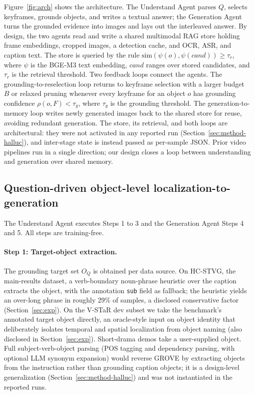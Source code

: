 Figure~\ref{fig:arch} shows the architecture. The Understand Agent parses $Q$, selects keyframes, grounds objects, and writes a textual answer; the Generation Agent turns the grounded evidence into images and lays out the interleaved answer. By design, the two agents read and write a shared multimodal RAG store holding frame embeddings, cropped images, a detection cache, and OCR, ASR, and caption text. The store is queried by the rule $\mathrm{sim}(\psi(o), \psi(cand)) \ge \tau_r$, where $\psi$ is the BGE-M3 text embedding, $cand$ ranges over stored candidates, and $\tau_r$ is the retrieval threshold. Two feedback loops connect the agents. The grounding-to-reselection loop returns to keyframe selection with a larger budget $B$ or relaxed pruning whenever every keyframe for an object $o$ has grounding confidence $\rho(o,F) < \tau_g$, where $\tau_g$ is the grounding threshold. The generation-to-memory loop writes newly generated images back to the shared store for reuse, avoiding redundant generation. The store, its retrieval, and both loops are architectural: they were not activated in any reported run (Section~\ref{sec:method-halluc}), and inter-stage state is instead passed as per-sample JSON. Prior video pipelines \citep{magnet2506,lvasagent2503} run in a single direction; our design closes a loop between understanding and generation over shared memory.

\subsection{Question-driven object-level localization-to-generation}\label{sec:method-pipeline}

The Understand Agent executes Steps 1 to 3 and the Generation Agent Steps 4 and 5. All steps are training-free.

\paragraph{Step 1: Target-object extraction.} The grounding target set $O_Q$ is obtained per data source. On HC-STVG, the main-results dataset, a verb-boundary noun-phrase heuristic over the caption extracts the object, with the annotation \texttt{sub} field as fallback; the heuristic yields an over-long phrase in roughly 29\% of samples, a disclosed conservative factor (Section~\ref{sec:exp}). On the V-STaR dev subset we take the benchmark's annotated target object directly, an oracle-style input on object identity that deliberately isolates temporal and spatial localization from object naming (also disclosed in Section~\ref{sec:exp}). Short-drama demos take a user-supplied object. Full subject-verb-object parsing (POS tagging and dependency parsing, with optional LLM synonym expansion) would reverse GROVE \citep{grove2503} by extracting objects from the instruction rather than grounding caption objects; it is a design-level generalization (Section~\ref{sec:method-halluc}) and was not instantiated in the reported runs.

